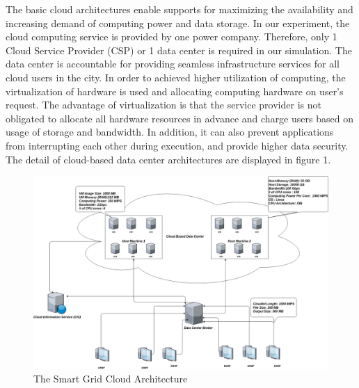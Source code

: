 \documentclass[12pt]{article}
\begin{document}
The basic cloud architectures enable supports for maximizing the availability and increasing demand of computing power and data storage\cite{ok2}. In our experiment, the cloud computing service is provided by one power company. Therefore, only 1 Cloud Service Provider (CSP) or 1 data center is required in our simulation. The data center is accountable for providing seamless infrastructure services for all cloud users in the city. In order to achieved higher utilization of computing, the virtualization of hardware is used and allocating computing hardware on user's request. The advantage of virtualization is that the service provider is not obligated to allocate all  hardware resources in advance and charge users based on usage of storage and bandwidth. In addition, it can also prevent applications from interrupting each other during execution, and provide higher data security. The detail of cloud-based data center architectures are displayed in figure 1.

\begin{figure}[ht!]
\centering
\includegraphics[scale=0.3]{Smart_Grid_Cloud.png}
\caption{The Smart Grid Cloud Architecture}
\end{figure}
\end{document}
